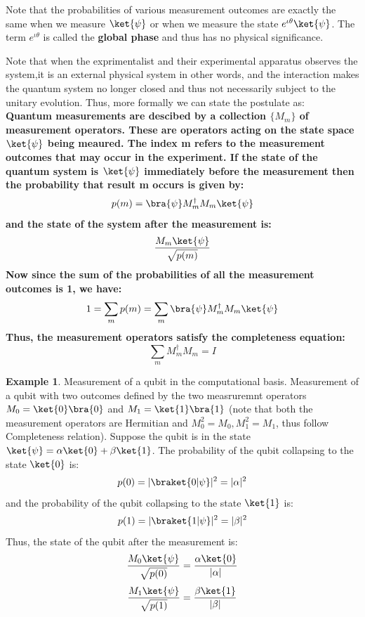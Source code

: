 \documentclass[12pt, oneside]{book}
\theoremstyle{definition}
\theoremstyle{definition}
\newtheorem{example}{Example}[section]
\theoremstyle{remark}
\begin{document}
Note that the probabilities of various measurement outcomes are exactly the same when we measure $\ket{\psi}$ or when we measure 
the state $e^{\iota \theta}\ket{\psi}$. The term $e^{\iota \theta}$ is called the \textbf{global phase} and thus has no physical significance.

Note that when the exprimentalist and their experimental apparatus observes the system,it is an external physical system in other words, and the interaction
makes the quantum system no longer closed and thus not necessarily subject to the unitary evolution. Thus, more formally we can state the postulate as: \\
\textbf{Quantum measurements are descibed by a collection $\{M_m\}$ of measurement operators.
These are operators acting on the state space $\ket{\psi}$ being meaured. The index m refers to the measurement outcomes 
that may occur in the experiment. If the state of the quantum system is $\ket{\psi}$ immediately before the measurement then the probability that result m
occurs is given by: 
\[
    p(m)=\bra{\psi}M_m^{\dagger}M_m\ket{\psi}
\]
and the state of the system after the measurement is:
\[
    \dfrac{M_m\ket{\psi}}{\sqrt{p(m)}}
\]
Now since the sum of the probabilities of all the measurement outcomes is 1, we have:
\[
    1 = \sum_m p(m) = \sum_m \bra{\psi}M_m^{\dagger}M_m\ket{\psi}
\]
Thus, the measurement operators satisfy the completeness equation:
\[
    \sum_m M_m^{\dagger}M_m=I
\]
}

\begin{example}
    Measurement of a qubit in the computational basis. Measurement of a qubit with two outcomes defined by the two measruremnt
    operators $M_0=\ket{0}\bra{0}$ and $M_1=\ket{1}\bra{1}$ (note that both the measurement operators are Hermitian and $M_0^2=M_0,M_1^2=M_1$, thus follow Completeness relation).
    Suppose the qubit is in the state $\ket{\psi}=\alpha\ket{0}+\beta\ket{1}$. The probability of the qubit collapsing to the state $\ket{0}$ is:
    \[
        p(0)=|\braket{0|\psi}|^2=|\alpha|^2
    \]
    and the probability of the qubit collapsing to the state $\ket{1}$ is:
    \[
        p(1)=|\braket{1|\psi}|^2=|\beta|^2
    \]
    Thus, the state of the qubit after the measurement is:
    \[
        \dfrac{M_0\ket{\psi}}{\sqrt{p(0)}}=\dfrac{\alpha\ket{0}}{|\alpha|}
    \]
    \[ 
        \dfrac{M_1\ket{\psi}}{\sqrt{p(1)}}=\dfrac{\beta\ket{1}}{|\beta|}
    \]
\end{example}
\end{document}
